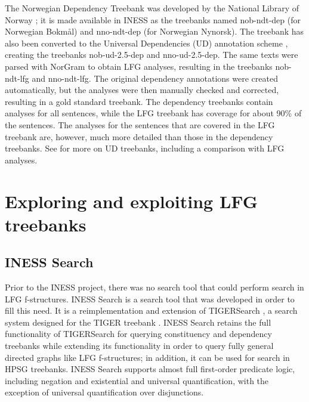 \documentclass[output=paper,hidelinks]{langscibook}
\begin{document}
The Norwegian Dependency Treebank was developed by the National Library of Norway \citep{Solberg14lrec}; it is made available in INESS as the treebanks named nob-ndt-dep (for Norwegian Bokmål) and nno-ndt-dep (for Norwegian Nynorsk).
The treebank has also been converted to the Universal Dependencies (UD) annotation scheme \citep{Ovrelid16ud}, creating the treebanks nob-ud-2.5-dep and nno-ud-2.5-dep.
The same texts were parsed with NorGram to obtain LFG analyses, resulting in the treebanks nob-ndt-lfg and nno-ndt-lfg.
The original dependency annotations were created automatically, but the analyses were then manually checked and corrected, resulting in a gold standard treebank.
The dependency treebanks contain analyses for all sentences, while the LFG treebank has coverage for about 90\% of the sentences.
The analyses for the sentences that are covered in the LFG treebank are, however, much more detailed than those in the dependency treebanks. %
See  for more on UD treebanks, including a comparison with LFG analyses.



\section{Exploring and exploiting LFG treebanks}\label{exploring} %

\subsection{INESS Search}\label{inessearch}

Prior to the INESS project, there was no search tool that could perform search in LFG f-structures.
INESS Search \citep{Meurer12,Meurer20designing,Rosen17Exploring} is a search tool that was developed in order to fill this need. %
It is a reimplementation and extension of TIGERSearch  \citep{Lezius02}, a search system designed for the TIGER treebank \citep{zinsmeisteretal02,brants2004}. %
INESS Search retains the full functionality of TIGERSearch for querying constituency and dependency treebanks while extending its functionality in order to query fully general directed graphs like LFG f-structures; in addition, it can be used for search in HPSG treebanks. INESS Search supports almost full first-order predicate logic, including negation and existential and universal quantification, with the exception of universal quantification over disjunctions.
\end{document}
